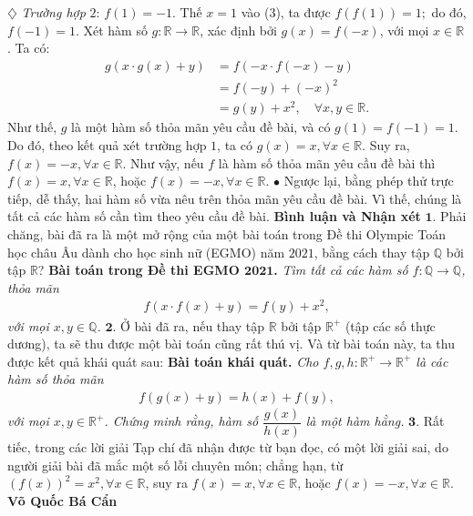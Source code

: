 \begin{multicols}{2}
	\vskip 0.05cm
	$\diamondsuit$ \textit{Trường hợp} $2$: $f(1) = -1$.
	\vskip 0.05cm  
	Thế $x = 1$ vào ($3$), ta được $f\left( {f\left( 1 \right)} \right) = 1;$  do đó, $f(-1) = 1$.
	\vskip 0.05cm 
	Xét hàm số  $g: \mathbb{R} \to \mathbb{R}$, xác định bởi $g(x) = f(-x)$, với mọi $x \in \mathbb{R}$. Ta có:
	\begin{align*}
		g\left( {x \cdot g\left( x \right) + y} \right) &= f\left( { - x \cdot f\left( { - x} \right) - y} \right) \\[-0.4ex]
		&= f\left( { - y} \right) + {\left( { - x} \right)^2} \\[-0.4ex]
		&= g\left( y \right) + {x^2},\quad\forall x,y \in \mathbb{R}.
	\end{align*}
	Như thế, $g$ là một hàm số thỏa mãn yêu cầu đề bài, và có $g(1) = f(-1) = 1$. Do đó, theo kết quả xét trường hợp $1$, ta có  $g(x) = x, \forall x\in \mathbb{R}$. Suy ra,  $f(x) = -x, \forall x \in \mathbb{R}$.
	\vskip 0.05cm
	Như vậy, nếu $f$  là hàm số thỏa mãn yêu cầu đề bài thì  $f(x) = x, \forall x \in \mathbb{R}$, hoặc  $f(x) = -x, \forall x \in \mathbb{R}$.
	\vskip 0.05cm
	$\bullet$ Ngược lại, bằng phép thử trực tiếp, dễ thấy, hai hàm số vừa nêu trên thỏa mãn yêu cầu đề bài. Vì thế, chúng là tất cả các hàm số cần tìm theo yêu cầu đề bài.
	\vskip 0.05cm
	\textbf{\color{thachthuctoanhoc}Bình luận và Nhận xét}
	\vskip 0.05cm
	$\pmb{1.}$ Phải chăng, bài đã ra là một mở rộng của một bài toán trong Đề thi Olympic Toán học châu Âu dành cho học sinh nữ (EGMO) năm $2021$, bằng cách thay tập $\mathbb{Q}$  bởi tập  $\mathbb{R}$?
	\vskip 0.05cm
	\textbf{\color{thachthuctoanhoc}Bài toán trong Đề thi EGMO $\pmb{2021}$.} \textit{Tìm tất cả các hàm số $f: \mathbb{Q} \to \mathbb{Q}$, thỏa mãn
	\begin{align*}
		f\left( {x \cdot f\left( x \right) + y} \right) = f\left( y \right) + {x^2},
	\end{align*}
	với mọi  $x, y \in \mathbb{Q}$.}
	\vskip 0.05cm
	$\pmb{2.}$ Ở bài đã ra, nếu thay tập $\mathbb{R}$  bởi tập $\mathbb{R^+}$  (tập các số thực dương), ta sẽ thu được một bài toán cũng rất thú vị. Và từ bài toán này, ta thu được kết quả khái quát sau:
	\vskip 0.05cm
	\textbf{\color{thachthuctoanhoc}Bài toán khái quát.} \textit{Cho $f,g,h: \mathbb{R^+} \to \mathbb{R^+}$  là các hàm số thỏa mãn
	\begin{align*}
		f\left( {g\left( x \right) + y} \right) = h\left( x \right) + f\left( y \right),
	\end{align*}
	với mọi $x,y \in \mathbb{R^+}$. Chứng minh rằng, hàm số  $\dfrac{g(x)}{h(x)}$ là một hàm hằng.}
	\vskip 0.05cm
	$\pmb{3.}$ Rất tiếc, trong các lời giải Tạp chí đã nhận được từ bạn đọc, có một lời giải sai, do người giải bài đã mắc một số lỗi chuyên môn; chẳng hạn, từ  ${\left( {f\left( x \right)} \right)^2} = {x^2},\forall x \in \mathbb{R}$, suy ra  $f(x) = x, \forall x \in \mathbb{R}$, hoặc  $f\left( x \right) =  - x,\forall x \in \mathbb{R}$.
	\vskip 0.05cm
	\hfill	\textbf{\color{thachthuctoanhoc}Võ Quốc Bá Cẩn}
\end{multicols}
